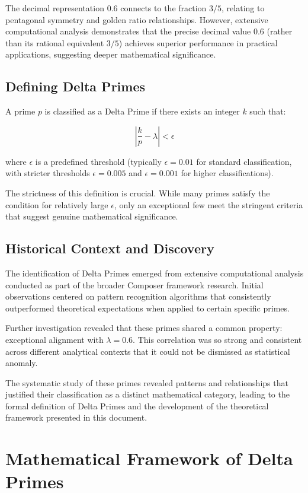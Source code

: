 \documentclass[12pt,a4paper]{report}
\newcommand{\lambdaval}{\lambda}
\begin{document}
The decimal representation $0.6$ connects to the fraction $3/5$, relating to pentagonal symmetry and golden ratio relationships. However, extensive computational analysis demonstrates that the precise decimal value $0.6$ (rather than its rational equivalent $3/5$) achieves superior performance in practical applications, suggesting deeper mathematical significance.

\section{Defining Delta Primes}

A prime $p$ is classified as a Delta Prime if there exists an integer $k$ such that:

\[
\left| \frac{k}{p} - \lambdaval \right| < \epsilon
\]

where $\epsilon$ is a predefined threshold (typically $\epsilon = 0.01$ for standard classification, with stricter thresholds $\epsilon = 0.005$ and $\epsilon = 0.001$ for higher classifications).

The strictness of this definition is crucial. While many primes satisfy the condition for relatively large $\epsilon$, only an exceptional few meet the stringent criteria that suggest genuine mathematical significance.

\section{Historical Context and Discovery}

The identification of Delta Primes emerged from extensive computational analysis conducted as part of the broader Composer framework research. Initial observations centered on pattern recognition algorithms that consistently outperformed theoretical expectations when applied to certain specific primes.

Further investigation revealed that these primes shared a common property: exceptional alignment with $\lambdaval = 0.6$. This correlation was so strong and consistent across different analytical contexts that it could not be dismissed as statistical anomaly.

The systematic study of these primes revealed patterns and relationships that justified their classification as a distinct mathematical category, leading to the formal definition of Delta Primes and the development of the theoretical framework presented in this document.

\chapter{Mathematical Framework of Delta Primes}
\end{document}
